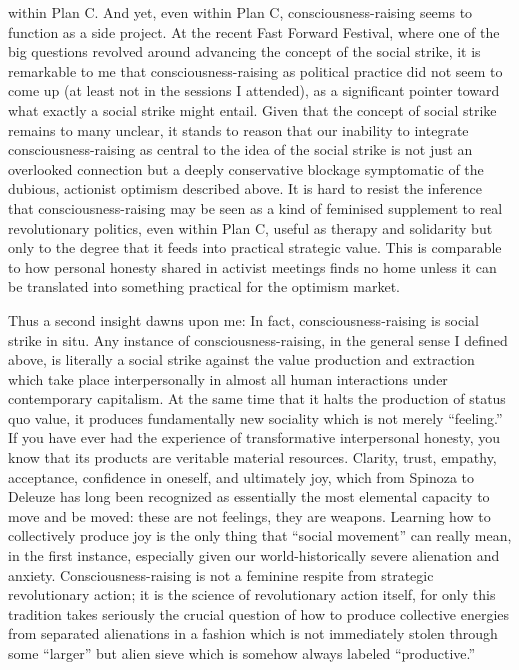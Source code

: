 \documentclass[a4paper,12pt,margin=.5in]{article}
\begin{document}
within Plan C. And yet, even within Plan C, consciousness-raising seems
to function as a side project. At the recent Fast Forward Festival,
where one of the big questions revolved around advancing the concept of
the social strike, it is remarkable to me that consciousness-raising as
political practice did not seem to come up (at least not in the sessions
I attended), as a significant pointer toward what exactly a social
strike might entail. Given that the concept of social strike remains to
many unclear, it stands to reason that our inability to integrate
consciousness-raising as central to the idea of the social strike is not
just an overlooked connection but a deeply conservative blockage
symptomatic of the dubious, actionist optimism described above. It is
hard to resist the inference that consciousness-raising may be seen as a
kind of feminised supplement to real revolutionary politics, even within
Plan C, useful as therapy and solidarity but only to the degree that it
feeds into practical strategic value. This is comparable to how personal
honesty shared in activist meetings finds no home unless it can be
translated into something practical for the optimism market.

Thus a second insight dawns upon me: In fact, consciousness-raising is
social strike in situ. Any instance of consciousness-raising, in the
general sense I defined above, is literally a social strike against the
value production and extraction which take place interpersonally in
almost all human interactions under contemporary capitalism. At the same
time that it halts the production of status quo value, it produces
fundamentally new sociality which is not merely ``feeling.'' If you have
ever had the experience of transformative interpersonal honesty, you
know that its products are veritable material resources. Clarity, trust,
empathy, acceptance, confidence in oneself, and ultimately joy, which
from Spinoza to Deleuze has long been recognized as essentially the most
elemental capacity to move and be moved: these are not feelings, they
are weapons. Learning how to collectively produce joy is the only thing
that ``social movement'' can really mean, in the first instance,
especially given our world-historically severe alienation and anxiety.
Consciousness-raising is not a feminine respite from strategic
revolutionary action; it is the science of revolutionary action itself,
for only this tradition takes seriously the crucial question of how to
produce collective energies from separated alienations in a fashion
which is not immediately stolen through some ``larger'' but alien sieve
which is somehow always labeled ``productive.''
\end{document}
